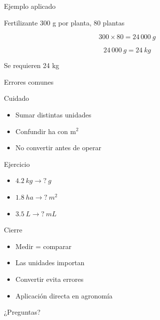 \documentclass[aspectratio=169,10pt]{beamer}
\begin{document}
	\begin{frame}{Ejemplo aplicado}
		\begin{block}{Fertilizante}
			300 g por planta, 80 plantas
		\end{block}
		
		\pause
		\[
		300 \times 80 = 24\,000\ g
		\]
		
		\pause
		\[
		24\,000\ g = 24\ kg
		\]
		
		\pause
		\begin{exampleblock}
			Se requieren 24 kg
		\end{exampleblock}
	\end{frame}
	
	\begin{frame}{Errores comunes}
		\begin{alertblock}{Cuidado}
			\begin{itemize}[<+->]
				\item Sumar distintas unidades
				\item Confundir ha con m$^2$
				\item No convertir antes de operar
			\end{itemize}
		\end{alertblock}
	\end{frame}
	
	\begin{frame}{Ejercicio}
		\begin{itemize}[<+->]
			\item \(4.2\ kg \rightarrow ?\ g\)
			\item \(1.8\ ha \rightarrow ?\ m^2\)
			\item \(3.5\ L \rightarrow ?\ mL\)
		\end{itemize}
	\end{frame}
	
	\begin{frame}{Cierre}
		\begin{itemize}[<+->]
			\item Medir = comparar
			\item Las unidades importan
			\item Convertir evita errores
			\item Aplicación directa en agronomía
		\end{itemize}
	\end{frame}
	
	\begin{frame}
		\centering
		\Huge ¿Preguntas?
	\end{frame}
	
\end{document}
